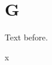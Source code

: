 \documentclass{closettwin}
\begin{document}
\mainmatter
\chapter{G}
Text before.
\begin{insightbox}[L]x\end{insightbox}
\end{document}
